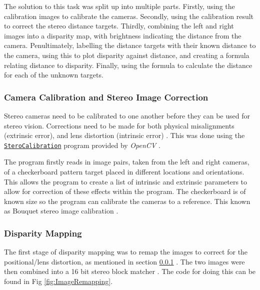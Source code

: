 \documentclass[conference]{IEEEtran}
\begin{document}
The solution to this task was split up into multiple parts. Firstly, using the calibration images to calibrate the cameras. Secondly, using the calibration result to correct the stereo distance targets. Thirdly, combining the left and right images into a disparity map, with brightness indicating the distance from the camera. Penultimately, labelling the distance targets with their known distance to the camera, using this to plot disparity against distance, and creating a formula relating distance to disparity. Finally, using the formula to calculate the distance for each of the unknown targets.

\subsubsection{Camera Calibration and Stereo Image Correction} \label{Camera_Calibration}

Stereo cameras need to be calibrated to one another before they can be used for stereo vision. Corrections need to be made for both physical misalignments (extrinsic error), and lens distortion (intrinsic error) \cite{Stero_Calibration}. This was done using the \href{https://docs.opencv.org/2.4/modules/calib3d/doc/camera_calibration_and_3d_reconstruction.html?highlight=stereocalibration}{\texttt{SteroCalibration}} program provided by \textit{OpenCV} \cite{Book_Calibration}.

The program firstly reads in image pairs, taken from the left and right cameras, of a checkerboard pattern target placed in different locations and orientations. This allows the program to create a list of intrinsic and extrinsic parameters to allow for correction of these effects within the program. The checkerboard is of known size so the program can calibrate the cameras to a reference. This known as Bouquet stereo image calibration \cite{Bouget}.

\subsubsection{Disparity Mapping} \label{Disparity_Mapping}

The first stage of disparity mapping was to remap the images to correct for the positional/lens distortion, as mentioned in section \ref{Camera_Calibration} \cite{OpenCV_Remapping}. The two images were then combined into a 16 bit stereo block matcher \cite{Stereo_Block_Matching}. The code for doing this can be found in Fig \ref{fig:ImageRemapping}.
\end{document}
